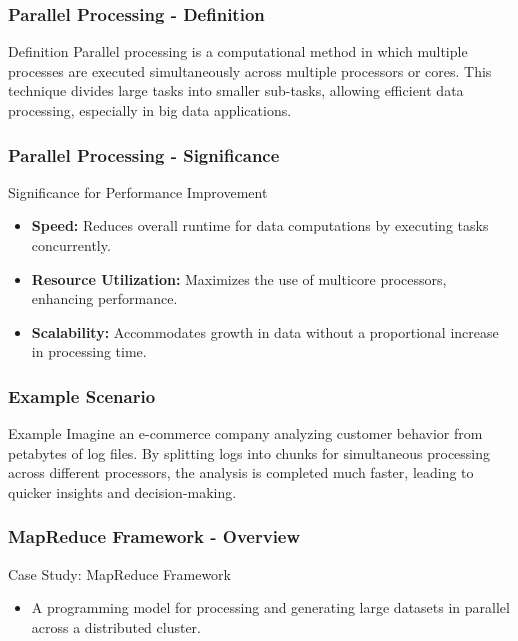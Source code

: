 \documentclass[aspectratio=169]{beamer}
\begin{document}
\begin{frame}[fragile]
    \frametitle{Parallel Processing - Definition}
    \begin{block}{Definition}
        Parallel processing is a computational method in which multiple processes are executed simultaneously across multiple processors or cores. This technique divides large tasks into smaller sub-tasks, allowing efficient data processing, especially in big data applications.
    \end{block}
\end{frame}

\begin{frame}[fragile]
    \frametitle{Parallel Processing - Significance}
    \begin{block}{Significance for Performance Improvement}
        \begin{itemize}
            \item \textbf{Speed:} Reduces overall runtime for data computations by executing tasks concurrently.
            \item \textbf{Resource Utilization:} Maximizes the use of multicore processors, enhancing performance.
            \item \textbf{Scalability:} Accommodates growth in data without a proportional increase in processing time.
        \end{itemize}
    \end{block}
\end{frame}

\begin{frame}[fragile]
    \frametitle{Example Scenario}
    \begin{block}{Example}
        Imagine an e-commerce company analyzing customer behavior from petabytes of log files. By splitting logs into chunks for simultaneous processing across different processors, the analysis is completed much faster, leading to quicker insights and decision-making.
    \end{block}
\end{frame}

\begin{frame}[fragile]
    \frametitle{MapReduce Framework - Overview}
    \begin{block}{Case Study: MapReduce Framework}
        \begin{itemize}
            \item A programming model for processing and generating large datasets in parallel across a distributed cluster.
        \end{itemize}
    \end{block}
\end{frame}
\end{document}
